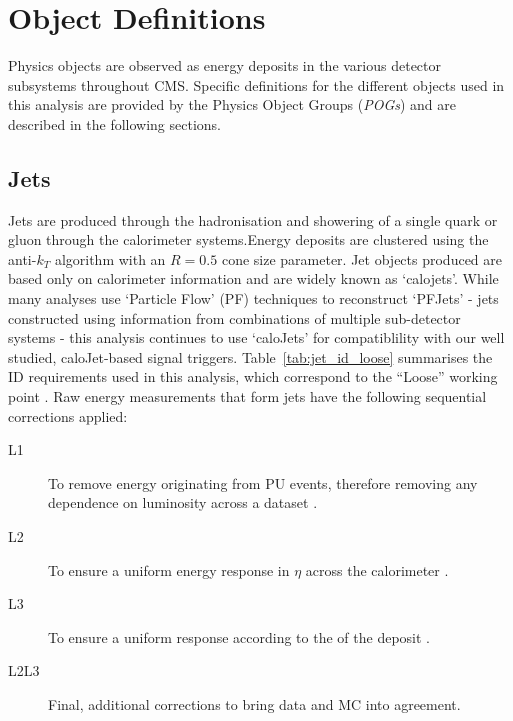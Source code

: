 \chapter{Object Definitions}
\label{ch:objects}

\ifpdf
    \graphicspath{{Chapter4/Figs/Raster/}{Chapter4/Figs/PDF/}{Chapter4/Figs/}}
\else
    \graphicspath{{Chapter4/Figs/Vector/}{Chapter4/Figs/}}
\fi



Physics objects are observed as energy deposits in the various detector 
subsystems throughout CMS. Specific definitions for the different 
objects used in this analysis are provided by the Physics Object Groups (\emph{POGs})
and are described in the following sections.


\section{Jets}  %
\label{sec:objects_jets}

Jets are produced through the hadronisation and showering of a single quark or gluon 
through the calorimeter systems.Energy deposits 
are clustered using the anti-$k_T$ algorithm \cite{antikt} with
an $R=0.5$ cone size parameter. Jet objects produced are based only
on calorimeter information and are widely known as `calojets'. While many analyses use
`Particle Flow' (PF) techniques to reconstruct `PFJets' - jets constructed using information
from combinations of multiple sub-detector systems - this analysis continues to use `caloJets'
for compatiblility with our well studied, caloJet-based signal triggers.
Table~\ref{tab:jet_id_loose} summarises the ID requirements used in this 
analysis, which correspond to the ``Loose'' working point \cite{ref:jet-id}.
Raw energy measurements that form jets have the following sequential
corrections \cite{ref:jet-jes, 2011JInst...611002C} applied:
\begin{description}
\item[L1] To remove energy originating from PU events, therefore removing any
dependence on luminosity across a dataset \cite{Cacciari2008119, 1126-6708-2008-04-005}.
\item[L2] To ensure a uniform energy response in $\eta$ across the calorimeter \cite{Chatrchyan:2011ds}.
\item[L3] To ensure a uniform response according to the \Pt of the deposit \cite{Chatrchyan:2011ds}.
\item[L2L3] Final, additional corrections to bring data and MC into agreement.
\end{description}


